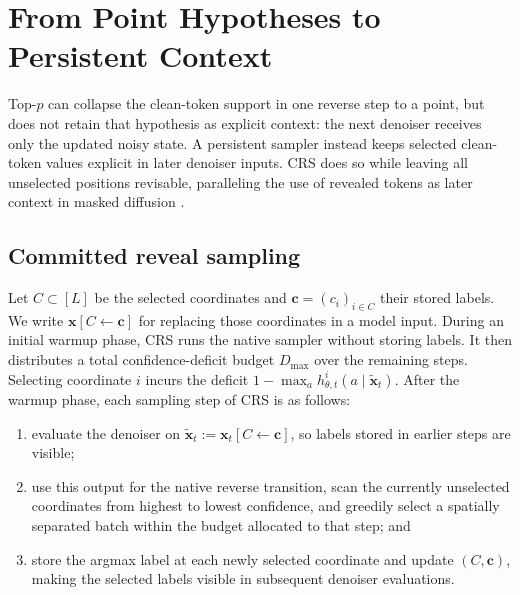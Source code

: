 \documentclass{article}
\newcommand{\1}{\mathbf 1}
\newcommand{\CRS}{\textsc{CRS}}
\theoremstyle{definition}
\begin{document}
\section{From Point Hypotheses to Persistent Context}
\label{sec:persistent-context}

Top-$p$ can collapse the clean-token support in one reverse step to a point,
but does not retain that hypothesis as explicit context: the next denoiser
receives only the updated noisy state. A persistent sampler instead keeps
selected clean-token values explicit in later denoiser inputs. \CRS{} does so
while leaving all unselected positions revisable, paralleling the use of
revealed tokens as later context in masked diffusion
\citep{chang2022maskgit,hayakawa2026demystifying}.

\subsection{Committed reveal sampling}
\label{sec:crs-method}

Let $C\subset[L]$ be the selected coordinates and
$\bm c=(c_i)_{i\in C}$ their stored labels. We write
$\bm x[C\leftarrow\bm c]$ for replacing those coordinates in a model input.
During an initial warmup phase, \CRS{} runs the native sampler without storing
labels. It then distributes a total confidence-deficit budget $D_{\max}$ over
the remaining steps. Selecting coordinate $i$ incurs the deficit
$1-\max_a h_{\theta,t}^i(a\mid\widetilde{\bm x}_t)$.
After the warmup phase, each sampling step of \CRS{} is as follows:
\begin{enumerate}[leftmargin=*,itemsep=1pt,topsep=2pt]
  \item evaluate the denoiser on
  $\widetilde{\bm x}_t:=\bm x_t[C\leftarrow\bm c]$, so labels stored in earlier
  steps are visible;
  \item use this output for the native reverse transition, scan the currently
  unselected coordinates from highest to lowest confidence, and greedily
  select a spatially separated batch within the budget allocated to that
  step; and
  \item store the argmax label at each newly selected coordinate and update
  $(C,\bm c)$, making the selected labels visible in subsequent denoiser
  evaluations.
\end{enumerate}
\end{document}
